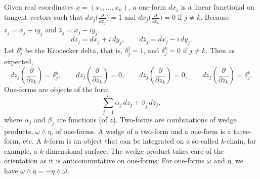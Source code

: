 \documentclass[12pt,openany]{book}
\theoremstyle{plain}
\theoremstyle{remark}
\theoremstyle{definition}
\theoremstyle{exercise}
\theoremstyle{example}
\begin{document}
Given real coordinates $x = (x_1,\ldots,x_n)$, a one-form $d x_j$ is a linear functional on tangent vectors
such that $d x_j \bigl( \frac{\partial}{\partial x_j} \bigr) = 1$ and
$d x_j \bigl( \frac{\partial}{\partial x_k} \bigr) = 0$ if $j \not= k$.
Because
$z_j = x_j + i y_j$ and
$\bar{z}_j = x_j - i y_j$,
%
\begin{equation*}
d z_j = d x_j + i \, d y_j , 
\qquad
d \bar{z}_j = d x_j - i \, d y_j . 
\end{equation*}
Let
%
$\delta_{j}^k$ be the Kronecker delta, that is, $\delta_j^j = 1$,
and $\delta_j^k = 0$ if $j \not= k$.  Then as expected,
\begin{equation*}
d z_j \left( \frac{\partial}{\partial z_k} \right) = \delta_j^k ,
\qquad
d z_j \left( \frac{\partial}{\partial \bar{z}_k} \right) = 0 ,
\qquad
d \bar{z}_j \left( \frac{\partial}{\partial z_k} \right) = 0 ,
\qquad
d \bar{z}_j \left( \frac{\partial}{\partial \bar{z}_k} \right) = \delta_j^k
.
\end{equation*}
One-forms are objects of the form
\begin{equation*}
\sum_{j=1}^n \alpha_j \, d z_j + 
\beta_j \, d \bar{z}_j ,
\end{equation*}
where $\alpha_j$ and $\beta_j$ are functions (of $z$).
Two-forms are combinations of wedge products,
$\omega \wedge \eta$, of one-forms.  A wedge of a two-form and
a one-form is a three-form, etc.
A $k$-form is an object that 
can be integrated on a so-called $k$-chain, for example, a
$k$-dimensional surface.  The wedge product takes care of the orientation
as it is anticommutative on one-forms:
For one-forms $\omega$ and $\eta$, we have
$\omega \wedge \eta = - \eta \wedge \omega$.
\end{document}
